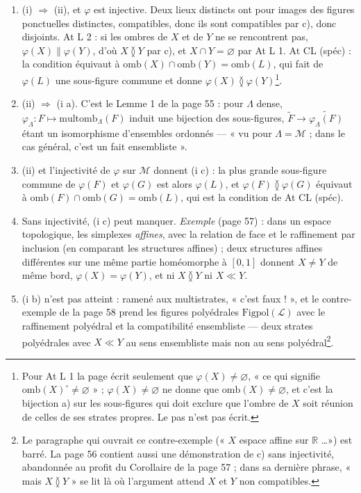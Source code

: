 \documentclass[11pt,a4paper]{article}
\begin{document}
\begin{enumerate}
\item[--] (i) $\Rightarrow$ (ii), et $\varphi$ est injective. Deux lieux distincts ont
pour images des figures ponctuelles distinctes, compatibles, donc ils sont
compatibles par c), donc disjoints. At L 2 : si les ombres de $X$ et de $Y$ ne se
rencontrent pas, $\varphi(X) \parallel \varphi(Y)$, d'où $X \between Y$ par c), et
$X \cap Y = \varnothing$ par At L 1. At CL (spéc) : la condition équivaut à
$\mathrm{omb}(X) \cap \mathrm{omb}(Y) = \mathrm{omb}(L)$, qui fait de $\varphi(L)$
une sous-figure commune et donne $\varphi(X) \between \varphi(Y)$\footnote{Pour At
L 1 la page écrit seulement que $\varphi(X) \neq \varnothing$, « ce qui signifie
$\mathrm{omb}(X)^{\circ} \neq \varnothing$ » ; $\varphi(X) \neq \varnothing$ ne
donne que $\mathrm{omb}(X) \neq \varnothing$, et c'est la bijection a) sur les
sous-figures qui doit exclure que l'ombre de $X$ soit réunion de celles de ses
strates propres. Le pas n'est pas écrit.}.
\item[--] (ii) $\Rightarrow$ (i a). C'est le Lemme 1 de la page 55 : pour $\Lambda$
dense, $\varphi_{\Lambda} : F \mapsto \mathrm{multomb}_{\Lambda}(F)$ induit une
bijection des sous-figures, $\widetilde{F} \to \widetilde{\varphi_{\Lambda}(F)}$
étant un isomorphisme d'ensembles ordonnés --- « vu pour $\Lambda = \mathcal{M}$ ;
dans le cas général, c'est un fait ensembliste ».
\item[--] (ii) et l'injectivité de $\varphi$ sur $\mathcal{M}$ donnent (i c) : la
plus grande sous-figure commune de $\varphi(F)$ et $\varphi(G)$ est alors
$\varphi(L)$, et $\varphi(F) \between \varphi(G)$ équivaut à $\mathrm{omb}(F) \cap
\mathrm{omb}(G) = \mathrm{omb}(L)$, qui est la condition de At CL (spéc).
\item[--] Sans injectivité, (i c) peut manquer. \emph{Exemple} (page 57) : dans un
espace topologique, les simplexes \emph{affines}, avec la relation de face et le
raffinement par inclusion (en comparant les structures affines) ; deux structures
affines différentes sur une même partie homéomorphe à $[0,1]$ donnent $X \neq Y$
de même bord, $\varphi(X) = \varphi(Y)$, et ni $X \between Y$ ni $X \ll Y$.
\item[--] (i b) n'est pas atteint : ramené aux multistrates, « c'est faux ! », et
le contre-exemple de la page 58 prend les figures polyédrales
$\mathrm{Figpol}(\mathcal{L})$ avec le raffinement polyédral et la compatibilité
ensembliste --- deux strates polyédrales avec $X \ll Y$ au sens ensembliste mais
non au sens polyédral\footnote{Le paragraphe qui ouvrait ce contre-exemple (« $X$
espace affine sur $\mathbb{R}$ \ldots ») est barré. La page 56 contient aussi une
démonstration de c) sans injectivité, abandonnée au profit du Corollaire de la page
57 ; dans sa dernière phrase, « mais $X \between Y$ » se lit là où l'argument
attend $X$ et $Y$ non compatibles.}.
\end{enumerate}
\end{document}
